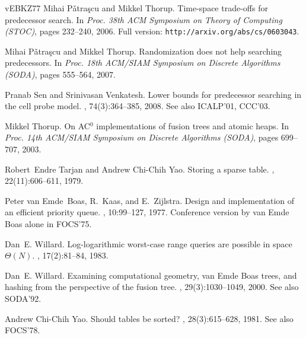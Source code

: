 \documentclass[11pt,a4paper]{ctexart}
\begin{document}
\begin{thebibliography}{vEBKZ77}
Mihai P\v{a}tra\c{s}cu and Mikkel Thorup.
\newblock Time-space trade-offs for predecessor search.
\newblock In {\em Proc. 38th ACM Symposium on Theory of Computing (STOC)}, pages 232--240, 2006.
\newblock Full version: {\texttt{http://arxiv.org/abs/cs/0603043}}.

Mihai P\v{a}tra\c{s}cu and Mikkel Thorup.
\newblock Randomization does not help searching predecessors.
\newblock In {\em Proc. 18th ACM/SIAM Symposium on Discrete Algorithms (SODA)}, pages 555--564, 2007.

Pranab Sen and Srinivasan Venkatesh.
\newblock Lower bounds for predecessor searching in the cell probe model.
, 74(3):364--385, 2008.
\newblock See also ICALP'01, CCC'03.

Mikkel Thorup.
\newblock On {AC$^0$} implementations of fusion trees and atomic heaps.
\newblock In {\em Proc. 14th ACM/SIAM Symposium on Discrete Algorithms (SODA)}, pages 699--707, 2003.

Robert~Endre Tarjan and Andrew Chi-Chih Yao.
\newblock Storing a sparse table.
, 22(11):606--611, 1979.

Peter van Emde~Boas, R.~Kaas, and E.~Zijlstra.
\newblock Design and implementation of an efficient priority queue.
, 10:99--127, 1977.
\newblock Conference version by van Emde Boas alone in FOCS'75.

Dan~E. Willard.
\newblock Log-logarithmic worst-case range queries are possible in space {$\Theta ({N})$}.
, 17(2):81--84, 1983.

Dan~E. Willard.
\newblock Examining computational geometry, van {E}mde {B}oas trees, and hashing from the perspective of the fusion tree.
, 29(3):1030--1049, 2000.
\newblock See also SODA'92.

Andrew Chi-Chih Yao.
\newblock Should tables be sorted?
, 28(3):615--628, 1981.
\newblock See also FOCS'78.

\end{thebibliography}
\end{document}
